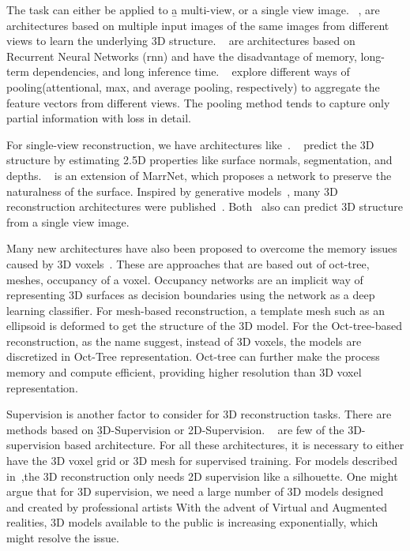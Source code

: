 The task can either be applied to \b{a multi-view, or a single view image}.
~\cite{Kar2017LearningAM, choy20163d, Yang_2019, huang2018deepmvs, Paschalidou2018RayNetLV, Xie_2019, Xie_2020},
are architectures based on multiple input images of the same images from different views to learn the underlying 3D structure.
~\cite{Kar2017LearningAM, choy20163d} are architectures based on Recurrent Neural Networks (\gls{rnn}) and have the disadvantage of memory,
long-term dependencies, and long inference time.
~\cite{Yang_2019, huang2018deepmvs, Paschalidou2018RayNetLV} explore different ways of pooling(attentional, max, and average pooling, respectively)
to aggregate the feature vectors from different views.
The pooling method tends to capture only partial information with loss in detail.

For single-view reconstruction, we have architectures like~\cite{wu2017marrnet,z-gan, Yang_219, wu2018learning, popov2020corenet}.
~\cite{wu2017marrnet} predict the 3D structure by estimating 2.5D properties like surface normals, segmentation, and depths.
~\cite{wu2018learning} is an extension of MarrNet, which proposes a network to preserve the naturalness of the surface.
Inspired by generative models~\cite{Goodfellow2014GenerativeAN,kingma2014autoencoding}, many 3D reconstruction architectures were published~\cite{z-gan, Yang_219,wu2017learning,Lunz2020InverseGG}.
Both~\cite{Xie_2019, Xie_2020} also can predict 3D structure from a single view image.

Many new architectures have also been proposed to overcome the memory issues caused by 3D voxels~\cite{tatarchenko2017octree,Richter2018MatryoshkaNP,Mescheder2019OccupancyNL,Gkioxari2019MeshR, wang2018pixel2mesh,groueix2018atlasnet,pan2019deep}.
These are approaches that are based out of oct-tree, meshes, occupancy of a voxel.
Occupancy networks are an implicit way of representing 3D surfaces as decision boundaries using the network as a deep learning classifier.
For mesh-based reconstruction, a template mesh such as an ellipsoid is deformed to get the structure of the 3D model.
For the Oct-tree-based reconstruction, as the name suggest, instead of 3D voxels, the models are discretized in Oct-Tree representation.
Oct-tree can further make the process memory and compute efficient, providing higher resolution than 3D voxel representation.

Supervision is another factor to consider for 3D reconstruction tasks.
There are methods based on \b{3D-Supervision or 2D-Supervision}.
~\cite{Xie_2019,Xie_2020,wu2017marrnet,groueix2018atlasnet,pan2019deep, chen2019learning} are few of the 3D-supervision based architecture.
For all these architectures, it is necessary to either have the 3D voxel grid or 3D mesh for supervised training.
For models described in~\cite{Lunz2020InverseGG,henderson2019learning},the 3D reconstruction only needs 2D supervision like a silhouette.
One might argue that for 3D supervision, we need a large number of 3D models designed and created by professional artists
With the advent of Virtual and Augmented realities, 3D models available to the public is increasing exponentially, which might resolve the issue.

